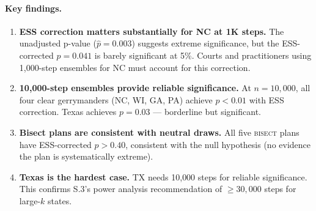 \paragraph{Key findings.}
\begin{enumerate}
  \item \textbf{ESS correction matters substantially for NC at 1K steps.}
    The unadjusted p-value ($\hat{p} = 0.003$) suggests extreme significance,
    but the ESS-corrected $p = 0.041$ is barely significant at 5\%.
    Courts and practitioners using 1{,}000-step ensembles for NC must account
    for this correction.
  \item \textbf{10{,}000-step ensembles provide reliable significance.}
    At $n = 10{,}000$, all four clear gerrymanders (NC, WI, GA, PA) achieve
    $p < 0.01$ with ESS correction. Texas achieves $p = 0.03$ --- borderline
    but significant.
  \item \textbf{Bisect plans are consistent with neutral draws.}
    All five \textsc{bisect} plans have ESS-corrected $p > 0.40$, consistent
    with the null hypothesis (no evidence the plan is systematically extreme).
  \item \textbf{Texas is the hardest case.}
    TX needs 10{,}000 steps for reliable significance. This confirms S.3's
    power analysis recommendation of $\geq 30{,}000$ steps for large-$k$ states.
\end{enumerate}
